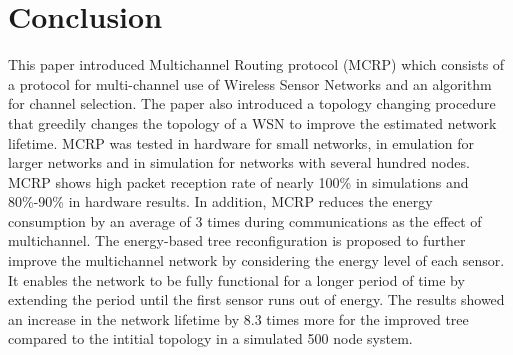 \section{Conclusion}
\label{Conclusion}

This paper introduced Multichannel Routing protocol (MCRP) which consists of a protocol for multi-channel use of Wireless Sensor Networks and an algorithm for channel selection. The paper also introduced a topology changing procedure that greedily changes the topology of a WSN to improve the estimated network lifetime.  MCRP was tested in hardware for small networks, in emulation for larger networks and in simulation for networks with several hundred nodes.  MCRP shows high packet reception rate of nearly 100\% in simulations and 80\%-90\% in hardware results. In addition, MCRP reduces the energy consumption by an average of 3 times during communications as the effect of multichannel.  The energy-based tree reconfiguration is proposed to further improve the multichannel network by considering the energy level of each sensor. 
It enables the network to be fully functional for a longer period of time by extending the period until the first sensor runs out of energy.  The results showed an increase in the network lifetime by 8.3 times more for the improved tree compared to the intitial topology in a simulated 500 node system.
